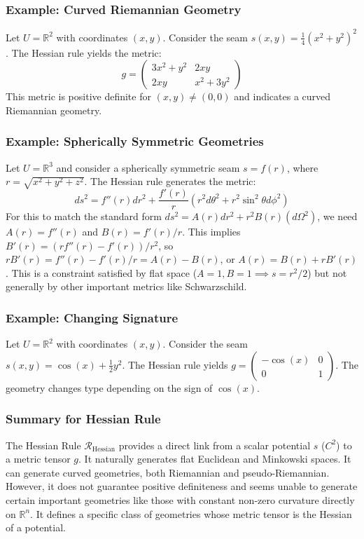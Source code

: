 \documentclass[twoside,twocolumn]{article}
\begin{document}
\subsubsection{Example: Curved Riemannian Geometry}
Let $U = \mathbb{R}^2$ with coordinates $(x, y)$. Consider the seam $s(x, y) = \frac{1}{4} (x^2 + y^2)^2$. The Hessian rule yields the metric:
$$ g = \begin{pmatrix} 3x^2+y^2 & 2xy \\ 2xy & x^2+3y^2 \end{pmatrix} $$
This metric is positive definite for $(x,y) \neq (0,0)$ and indicates a curved Riemannian geometry.

\subsubsection{Example: Spherically Symmetric Geometries}
Let $U = \mathbb{R}^3$ and consider a spherically symmetric seam $s = f(r)$, where $r = \sqrt{x^2+y^2+z^2}$. The Hessian rule generates the metric:
$$ ds^2 = f''(r) dr^2 + \frac{f'(r)}{r} (r^2 d\theta^2 + r^2 \sin^2\theta d\phi^2) $$
For this to match the standard form $ds^2 = A(r) dr^2 + r^2 B(r) (d\Omega^2)$, we need $A(r) = f''(r)$ and $B(r) = f'(r)/r$. This implies $B'(r) = (r f''(r) - f'(r))/r^2$, so $r B'(r) = f''(r) - f'(r)/r = A(r) - B(r)$, or $A(r) = B(r) + r B'(r)$. This is a constraint satisfied by flat space ($A=1, B=1 \implies s=r^2/2$) but not generally by other important metrics like Schwarzschild.

\subsubsection{Example: Changing Signature}
Let $U = \mathbb{R}^2$ with coordinates $(x, y)$. Consider the seam $s(x, y) = \cos(x) + \frac{1}{2} y^2$. The Hessian rule yields $g = \begin{pmatrix} -\cos(x) & 0 \\ 0 & 1 \end{pmatrix}$. The geometry changes type depending on the sign of $\cos(x)$.

\subsubsection{Summary for Hessian Rule}
The Hessian Rule $\mathcal{R}_{\text{Hessian}}$ provides a direct link from a scalar potential $s$ ($C^2$) to a metric tensor $g$. It naturally generates flat Euclidean and Minkowski spaces. It can generate curved geometries, both Riemannian and pseudo-Riemannian. However, it does not guarantee positive definiteness and seems unable to generate certain important geometries like those with constant non-zero curvature directly on $\mathbb{R}^n$. It defines a specific class of geometries whose metric tensor is the Hessian of a potential.
\end{document}
